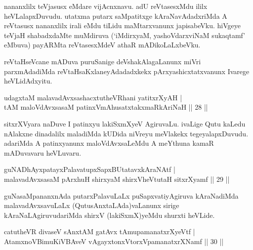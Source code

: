 \begin{artha}
nananxlilx teVjasusx eMdare vijAcnxnavu. adU reVtasesxMdu ililx 
heVLalapxDuvudu. utatxma putarx saMpatitxge kAraNavAdadxriMda A 
reVtasusx nananxlilx irali eMdu tiLidu maMtarxvanunx japisabeVku. 
hiVgeye teVjaH shabadxdaMte muMdiruva (`iMdirxyaM, yashoVdarxviNaM 
sukaqtamf' eMbuva) payARMta reVtasesxMdeV athaR mADikoLaLxbeVku.
\end{artha}


\begin{artha}
reVtaHseVcane mADuva puruSanige deVshakAlagaLanunx miVri parxmAdadiMda 
reVtaHsaKxlaneyAdadadxkekx pArxyashicxtatxvanunx Ivarege heVLidAdxyitu.
\end{artha}


\begin{shl}
udagxtaM malavadAvxsashacxtutheVR\s hani yatitxrXyAH | \\
tAM maloVdAvxsasaM patinxVmAhusatxtakxmaRkAriNaH \hfill|| 28 || 
\end{shl}

\begin{artha}
sitxrXVyara naDuve I patinxyu lakiSxmXyeV AgiruvaLu. ivaLige Qutu 
kaLedu nAlakxne dinadalilx maladiMda kUDida niVreyu meVlakekx 
tegeyalapxDuvudu. adariMda A patinxyanunx maloVdAvxsaLeMdu A meYthuna 
kamaR mADuvavaru heVLuvaru.
\end{artha}


\begin{shl}
guNADhAyxpatayxPalavatupxSapxBUtatavxkAraNAtf | \\
malavadAvxsasaM pArxhuH shirxyaM shirxVheVtutaH sitxrXyamf \hfill|| 29 || 
\end{shl}

\begin{artha}
guNasaMpananxnAda putarxPalavuLaLx puSapxvatiyAgiruva kAraNadiMda malavadAvxsavuLaLx (QutusAnxtaLAda)vaLanunx sirige kAraNaLAgiruvudariMda shirxV (lakiSxmX)yeMdu shurxti heVLide.
\end{artha}


\begin{shl}
catutheVR divaseV sAnxtAM gatAvx tAmupamanatxrXyeVtf | \\
AtamxnoV\s BimuKiVBAveV vAgayxtonxV\s torxVpamanatxrXNamf \hfill|| 30 || 
\end{shl}

